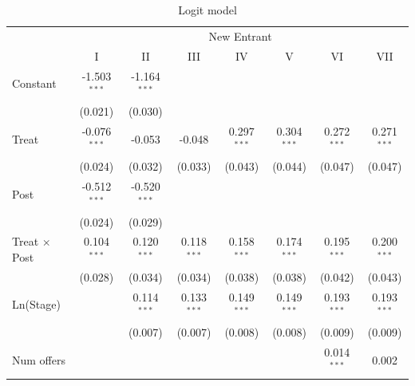 \documentclass[
]{article}
\begin{document}
\par\endgroup
\begin{table}[htbp]
   \caption{Logit model}
   \centering
   \small
   \begin{tabular}{lccccccc}
      \toprule
       & \multicolumn{7}{c}{New Entrant}\\
                                          & I              & II             & III           & IV            & V             & VI            & VII\\  
      Constant                            & -1.503$^{***}$ & -1.164$^{***}$ &               &               &               &               &   \\   
                                          & (0.021)        & (0.030)        &               &               &               &               &   \\   
      Treat                               & -0.076$^{***}$ & -0.053         & -0.048        & 0.297$^{***}$ & 0.304$^{***}$ & 0.272$^{***}$ & 0.271$^{***}$\\   
                                          & (0.024)        & (0.032)        & (0.033)       & (0.043)       & (0.044)       & (0.047)       & (0.047)\\   
      Post                                & -0.512$^{***}$ & -0.520$^{***}$ &               &               &               &               &   \\   
                                          & (0.024)        & (0.029)        &               &               &               &               &   \\   
      Treat $\times$ Post                 & 0.104$^{***}$  & 0.120$^{***}$  & 0.118$^{***}$ & 0.158$^{***}$ & 0.174$^{***}$ & 0.195$^{***}$ & 0.200$^{***}$\\   
                                          & (0.028)        & (0.034)        & (0.034)       & (0.038)       & (0.038)       & (0.042)       & (0.043)\\   
      Ln(Stage)                           &                & 0.114$^{***}$  & 0.133$^{***}$ & 0.149$^{***}$ & 0.149$^{***}$ & 0.193$^{***}$ & 0.193$^{***}$\\   
                                          &                & (0.007)        & (0.007)       & (0.008)       & (0.008)       & (0.009)       & (0.009)\\   
      Num offers                          &                &                &               &               &               & 0.014$^{***}$ & 0.002\\   

\end{tabular}
\end{table}
\end{document}
